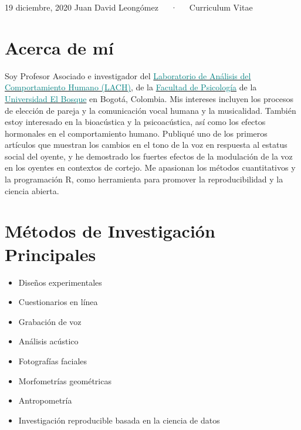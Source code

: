 \documentclass[11pt, a4paper]{awesome-cv}
\providecommand{\tightlist}{%
	\setlength{\itemsep}{0pt}\setlength{\parskip}{0pt}}
\begin{document}
\makecvheader

\makecvfooter
  {19 diciembre, 2020}
    {Juan David Leongómez~~~·~~~Curriculum Vitae}
  {\thepage}





\hypertarget{acerca-de-muxed}{%
\section{Acerca de mí}\label{acerca-de-muxed}}

Soy Profesor Asociado e investigador del
\href{https://sites.google.com/unbosque.edu.co/lach-es}{\textcolor{teal}{Laboratorio de Análisis del Comportamiento Humano (LACH)}},
de la
\href{https://www.uelbosque.edu.co/psicologia}{\textcolor{teal}{Facultad de Psicología}}
de la
\href{https://www.uelbosque.edu.co/}{\textcolor{teal}{Universidad El Bosque}}
en Bogotá, Colombia. Mis intereses incluyen los procesos de elección de
pareja y la comunicación vocal humana y la musicalidad. También estoy
interesado en la bioacústica y la psicoacústica, así como los efectos
hormonales en el comportamiento humano. Publiqué uno de los primeros
artículos que muestran los cambios en el tono de la voz en respuesta al
estatus social del oyente, y he demostrado los fuertes efectos de la
modulación de la voz en los oyentes en contextos de cortejo. Me
apasionan los métodos cuantitativos y la programación R, como
herramienta para promover la reproducibilidad y la ciencia abierta.

\hypertarget{muxe9todos-de-investigaciuxf3n-principales}{%
\section{Métodos de Investigación
Principales}\label{muxe9todos-de-investigaciuxf3n-principales}}

\begin{itemize}
\tightlist
\item
  Diseños experimentales
\item
  Cuestionarios en línea
\item
  Grabación de voz
\item
  Análisis acústico
\item
  Fotografías faciales
\item
  Morfometrías geométricas
\item
  Antropometría
\item
  Investigación reproducible basada en la ciencia de datos
\end{itemize}
\end{document}
